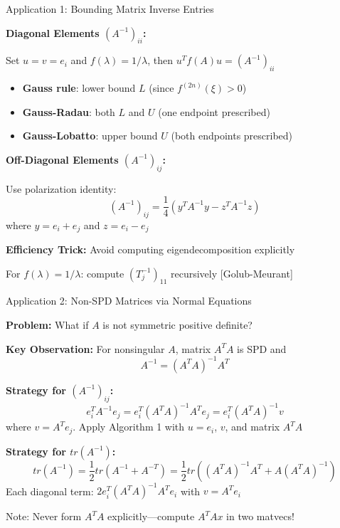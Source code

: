 \documentclass[aspectratio=169, 12pt]{beamer}
\begin{document}
\begin{frame}{Application 1: Bounding Matrix Inverse Entries}

\textbf{Diagonal Elements \((A^{-1})_{ii}\):}

Set \(u = v = e_i\) and \(f(\lambda) = 1/\lambda\), then \(u^T f(A) u = (A^{-1})_{ii}\)

\vspace{0.1cm}

\begin{itemize}
    \item \textbf{Gauss rule}: lower bound \(L\) (since \(f^{(2n)}(\xi) > 0\))
    \item \textbf{Gauss-Radau}: both \(L\) and \(U\) (one endpoint prescribed)
    \item \textbf{Gauss-Lobatto}: upper bound \(U\) (both endpoints prescribed)
\end{itemize}

\vspace{0.3cm}

\textbf{Off-Diagonal Elements \((A^{-1})_{ij}\):}

Use polarization identity:
\[
(A^{-1})_{ij} = \frac{1}{4}(y^T A^{-1} y - z^T A^{-1} z)
\]
where \(y = e_i + e_j\) and \(z = e_i - e_j\)

\vspace{0.3cm}

\textbf{Efficiency Trick:} Avoid computing eigendecomposition explicitly

For \(f(\lambda) = 1/\lambda\): compute \((T_j^{-1})_{11}\) recursively [Golub-Meurant]

\end{frame}

\begin{frame}{Application 2: Non-SPD Matrices via Normal Equations}

\textbf{Problem:} What if \(A\) is not symmetric positive definite?

\vspace{0.3cm}

\textbf{Key Observation:} For nonsingular \(A\), matrix \(A^T A\) is SPD and
\[
A^{-1} = (A^T A)^{-1} A^T
\]

\vspace{0.3cm}

\textbf{Strategy for \((A^{-1})_{ij}\):}
\[
e_i^T A^{-1} e_j = e_i^T (A^T A)^{-1} A^T e_j = e_i^T (A^T A)^{-1} v
\]
where \(v = A^T e_j\). Apply Algorithm 1 with \(u = e_i\), \(v\), and matrix \(A^T A\)

\vspace{0.3cm}

\textbf{Strategy for \(tr(A^{-1})\):}
\[
tr(A^{-1}) = \frac{1}{2} tr(A^{-1} + A^{-T}) = \frac{1}{2} tr((A^T A)^{-1} A^T + A (A^T A)^{-1})
\]
Each diagonal term: \(2 e_i^T (A^T A)^{-1} A^T e_i\) with \(v = A^T e_i\)

\vspace{0.3cm}

\alert{Note:} Never form \(A^T A\) explicitly---compute \(A^T A x\) in two matvecs!

\end{frame}
\end{document}
